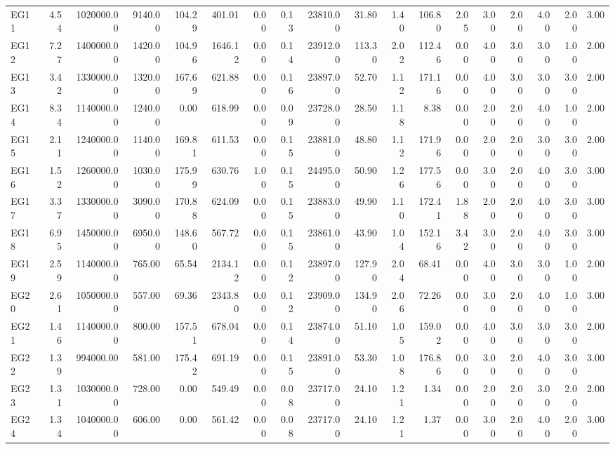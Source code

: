 \begin{tabular}{lrrrrrrrrrrrrrrrrr}
EG11 & 4.54 & 1020000.00 & 9140.00 & 104.29 & 401.01 & 0.00 & 0.13 & 23810.00 & 31.80 & 1.40 & 106.80 & 2.05 & 3.00 & 2.00 & 4.00 & 2.00 & 3.00 \\
EG12 & 7.27 & 1400000.00 & 1420.00 & 104.96 & 1646.12 & 0.00 & 0.14 & 23912.00 & 113.30 & 2.02 & 112.46 & 0.00 & 4.00 & 3.00 & 3.00 & 1.00 & 2.00 \\
EG13 & 3.42 & 1330000.00 & 1320.00 & 167.69 & 621.88 & 0.00 & 0.16 & 23897.00 & 52.70 & 1.12 & 171.16 & 0.00 & 4.00 & 3.00 & 3.00 & 3.00 & 2.00 \\
EG14 & 8.34 & 1140000.00 & 1240.00 & 0.00 & 618.99 & 0.00 & 0.09 & 23728.00 & 28.50 & 1.18 & 8.38 & 0.00 & 2.00 & 2.00 & 4.00 & 1.00 & 2.00 \\
EG15 & 2.11 & 1240000.00 & 1140.00 & 169.81 & 611.53 & 0.00 & 0.15 & 23881.00 & 48.80 & 1.12 & 171.96 & 0.00 & 2.00 & 2.00 & 3.00 & 3.00 & 2.00 \\
EG16 & 1.52 & 1260000.00 & 1030.00 & 175.99 & 630.76 & 1.00 & 0.15 & 24495.00 & 50.90 & 1.26 & 177.56 & 0.00 & 3.00 & 2.00 & 4.00 & 3.00 & 3.00 \\
EG17 & 3.37 & 1330000.00 & 3090.00 & 170.88 & 624.09 & 0.00 & 0.15 & 23883.00 & 49.90 & 1.10 & 172.41 & 1.88 & 2.00 & 2.00 & 4.00 & 3.00 & 3.00 \\
EG18 & 6.95 & 1450000.00 & 6950.00 & 148.60 & 567.72 & 0.00 & 0.15 & 23861.00 & 43.90 & 1.04 & 152.16 & 3.42 & 3.00 & 2.00 & 4.00 & 3.00 & 3.00 \\
EG19 & 2.59 & 1140000.00 & 765.00 & 65.54 & 2134.12 & 0.00 & 0.12 & 23897.00 & 127.90 & 2.04 & 68.41 & 0.00 & 4.00 & 3.00 & 3.00 & 1.00 & 2.00 \\
EG20 & 2.61 & 1050000.00 & 557.00 & 69.36 & 2343.80 & 0.00 & 0.12 & 23909.00 & 134.90 & 2.06 & 72.26 & 0.00 & 3.00 & 2.00 & 4.00 & 1.00 & 3.00 \\
EG21 & 1.46 & 1140000.00 & 800.00 & 157.51 & 678.04 & 0.00 & 0.14 & 23874.00 & 51.10 & 1.05 & 159.02 & 0.00 & 4.00 & 3.00 & 3.00 & 3.00 & 2.00 \\
EG22 & 1.39 & 994000.00 & 581.00 & 175.42 & 691.19 & 0.00 & 0.15 & 23891.00 & 53.30 & 1.08 & 176.86 & 0.00 & 3.00 & 2.00 & 4.00 & 3.00 & 3.00 \\
EG23 & 1.31 & 1030000.00 & 728.00 & 0.00 & 549.49 & 0.00 & 0.08 & 23717.00 & 24.10 & 1.21 & 1.34 & 0.00 & 2.00 & 2.00 & 3.00 & 2.00 & 2.00 \\
EG24 & 1.34 & 1040000.00 & 606.00 & 0.00 & 561.42 & 0.00 & 0.08 & 23717.00 & 24.10 & 1.21 & 1.37 & 0.00 & 3.00 & 2.00 & 4.00 & 2.00 & 3.00 \\

\end{tabular}
